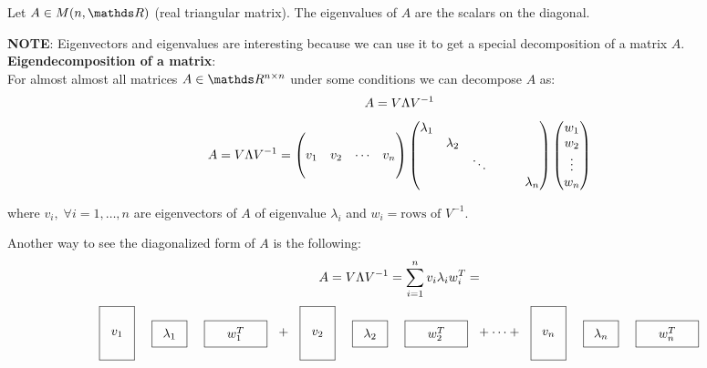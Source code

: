 \documentclass[ComputationalMathematics.tex]{subfiles}
\begin{document}
\begin{proposition}
  Let $A \in M(n, \R)$ (real triangular matrix). The eigenvalues of $A$ are the scalars on the diagonal.
\end{proposition}


\noindent \textbf{NOTE}: Eigenvectors and eigenvalues are interesting because we can use it to get a special decomposition of a matrix $A$.\\

\noindent \textbf{Eigendecomposition of a matrix}:\\
For almost almost all matrices $A \in \R^{n \times n}$ under some conditions we can decompose $A$ as:
 $$A = V \Lambda {V}^{-1}$$
\[
  A = V \Lambda {V}^{-1} = \begin{pmatrix}
    \\
    v_1 & v_2 & \cdots & v_n\\
    \\
  \end{pmatrix} 
  \begin{pmatrix}
    \lambda_1\\
    &\lambda_2\\
    && \ddots\\
    &&&&&\lambda_n\\
  \end{pmatrix} 
  \begin{pmatrix}
    w_1\\
    w_2\\
    \vdots\\
    w_n\\
  \end{pmatrix}
\]

where $v_i, \; \forall i=1, \ldots, n$ are eigenvectors of $A$ of eigenvalue $\lambda_i$ and $w_i = \text{rows of } V^{-1}$.\\

Another way to see the diagonalized form of $A$ is the following:
$$ A = V \Lambda {V}^{-1} = \sum\limits_{i=1}^{n} v_i\lambda_i w_i^T = $$
$$    \tallthin{$v_1$} \real{$\lambda_1$} \shortlarge{$w_1^T$} + \tallthin{$v_2$} \real{$\lambda_2$} \shortlarge{$w_2^T$} + \cdots + \tallthin{$v_n$} \real{$\lambda_n$} \shortlarge{$w_n^T$}
$$
\end{document}
